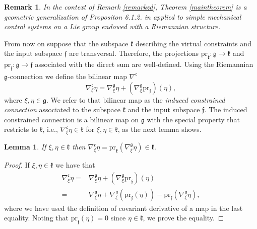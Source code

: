 \documentclass[letterpaper, 10 pt, conference]{ieeeconf}
\newtheorem{remark}{Remark}
\newtheorem{lemma}{Lemma}
\newcommand{\g}{\mathfrak{g}}
\begin{document}
\begin{remark}
In the context of Remark \ref{remarkzd}, Theorem \ref{maintheorem} is a geometric generalization of Propositon 6.1.2. in \cite{isidori1985nonlinear} applied to simple mechanical control systems on a Lie group endowed with a Riemannian structure.\end{remark}

From now on suppose that the subspace $\mathfrak{k}$ describing the virtual constraints 
and the input subspace $\mathfrak{f}$ are transversal. Therefore, the projections 
$\text{pr}_{\mathfrak{k}}:\g\rightarrow \mathfrak{k}$ and $\text{pr}_{\mathfrak{f}}:\g\rightarrow \mathfrak{f}$ 
associated with the direct sum are well-defined. Using the Riemannian $\g$-connection we define the bilinear map $\nabla^{\mathfrak{c}}$ 
\begin{equation}\label{virtual:nh:connection}
    \nabla^{\mathfrak{c}}_{\xi} \eta = \nabla^{\g}_{\xi} \eta + (\nabla_{\xi}^{\g}\text{pr}_{\mathfrak{f}})(\eta),
\end{equation} 
where $\xi,\eta\in\g$. We refer to that bilinear map as the  \textit{induced constrained connection} associated to the subspace $\mathfrak{k}$ and the input subspace $\mathfrak{f}$. The induced constrained connection is a bilinear map on $\g$ with the special property that restricts to $\mathfrak{k}$, i.e., $\nabla^{\mathfrak{c}}_\xi \eta \in \mathfrak{k}$ for $\xi,\eta\in \mathfrak{k}$, as the next lemma shows.

\begin{lemma}\label{constrained:property}
    If $\xi,\eta \in \mathfrak{k}$ then
    $\nabla^{\mathfrak{c}}_{\xi} \eta = \text{pr}_{\mathfrak{k}}(\nabla^{\g}_\xi \eta) \in \mathfrak{k}.$
\end{lemma}
\begin{proof}
If $\xi,\eta \in \mathfrak{k}$ we have that
    \begin{equation*}
        \begin{split}
            \nabla^{\mathfrak{c}}_{\xi} \eta = & \nabla^{\g}_{\xi} \eta + (\nabla^{\g}_{\xi}\text{pr}_{\mathfrak{f}})(\eta) \\
             = & \nabla^{\g}_{\xi} \eta + \nabla^{\g}_{\xi}(\text{pr}_{\mathfrak{f}}(\eta))- \text{pr}_{\mathfrak{f}}(\nabla^{\g}_{\xi} \eta),
        \end{split}
    \end{equation*}
    where we have used the definition of covariant derivative of a map in the last equality. Noting that $\text{pr}_{\mathfrak{f}}(\eta)=0$ since $\eta\in\mathfrak{k}$, we prove the equality.
\end{proof}
\end{document}
